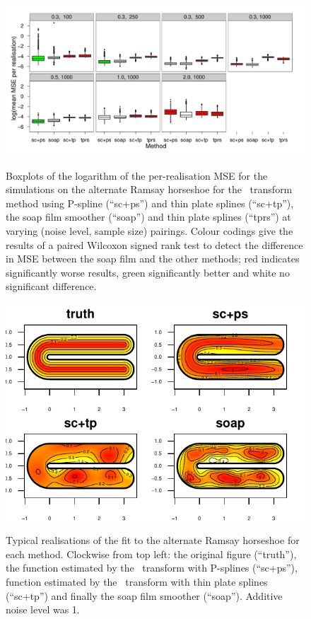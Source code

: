 \begin{figure}
\centering
\includegraphics{sc/tablecode/altramsay-boxplot.pdf} \\
\caption{Boxplots of the logarithm of the per-realisation MSE for the simulations on the alternate Ramsay horseshoe for the \sch\ transform method using P-spline (``sc+ps'') and thin plate splines (``sc+tp''), the soap film smoother (``soap'') and thin plate splines (``tprs'') at varying (noise level, sample size) pairings. Colour codings give the results of a paired Wilcoxon signed rank test to detect the difference in MSE between the soap film and the other methods; red indicates significantly worse results, green significantly better and white no significant difference.}
\label{sc-altram-boxplot}
\end{figure}


\begin{figure}
\centering
\includegraphics[width=6in]{sc/figs/altramsaycomp.pdf}\\
\caption{Typical realisations of the fit to the alternate Ramsay horseshoe for each method. Clockwise from top left: the original figure (``truth''), the function estimated by the \sch\ transform with P-splines (``sc+ps''), function estimated by the \sch\ transform with thin plate splines (``sc+tp'') and finally the soap film smoother (``soap''). Additive noise level was 1.}
\label{altramsaycomp}
\end{figure}


